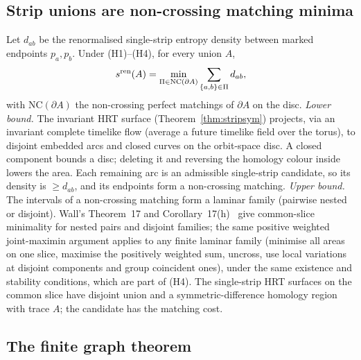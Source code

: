 \documentclass[aps,prd,onecolumn,superscriptaddress,nofootinbib,amsmath,amssymb,11pt]{revtex4-2}
\theoremstyle{definition}
\begin{document}
\subsection{Strip unions are non-crossing matching minima}\label{sec:stripmatch}

Let $d_{ab}$ be the renormalised single-strip entropy density between marked endpoints $p_a,p_b$. Under (H1)--(H4), for every union $A$,
\begin{equation}\label{eq:T7}
s^{\rm ren}(A)=\min_{\Pi\in\mathrm{NC}(\partial A)}\sum_{\{a,b\}\in\Pi}d_{ab},
\end{equation}
with $\mathrm{NC}(\partial A)$ the non-crossing perfect matchings of $\partial A$ on the disc.
\emph{Lower bound.} The invariant HRT surface (Theorem~\ref{thm:stripsym}) projects, via an invariant complete timelike flow (average a
future timelike field over the torus), to disjoint embedded arcs and closed curves on the orbit-space disc. A closed component bounds a
disc; deleting it and reversing the homology colour inside lowers the area. Each remaining arc is an admissible single-strip candidate,
so its density is $\ge d_{ab}$, and its endpoints form a non-crossing matching.
\emph{Upper bound.} The intervals of a non-crossing matching form a laminar family (pairwise nested or disjoint). Wall's Theorem~17 and
Corollary~17(h)~\cite{Wall2014} give common-slice minimality for nested pairs and disjoint families; the same positive weighted
joint-maximin argument applies to any finite laminar family (minimise all areas on one slice, maximise the positively weighted sum,
uncross, use local variations at disjoint components and group coincident ones), under the same existence and stability conditions,
which are part of (H4). The single-strip HRT surfaces on the common slice have disjoint union and a symmetric-difference homology region
with trace $A$; the candidate has the matching cost.

\subsection{The finite graph theorem}\label{sec:stripgraph}
\end{document}
